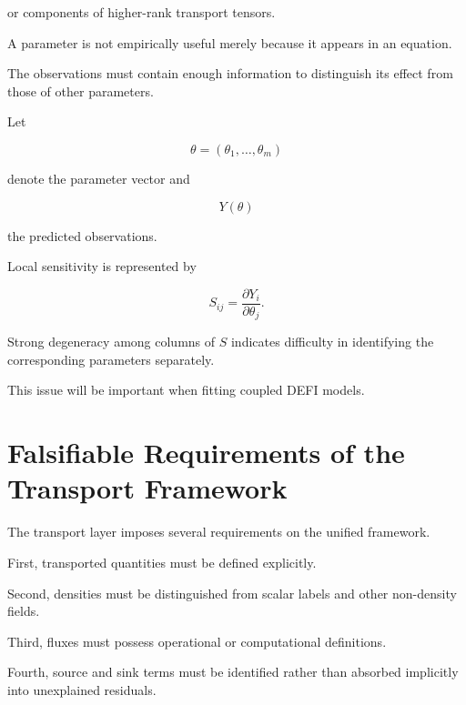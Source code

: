 \documentclass[12pt,oneside]{book}
\begin{document}
or components of higher-rank transport tensors.

A parameter is not empirically useful merely because it appears
in an equation.

The observations must contain enough information to distinguish
its effect from those of other parameters.

Let

\begin{equation}
    \theta
    =
    \left(
        \theta_1,
        \ldots,
        \theta_m
    \right)
\end{equation}

denote the parameter vector and

\begin{equation}
    Y(\theta)
\end{equation}

the predicted observations.

Local sensitivity is represented by

\begin{equation}
    S_{ij}
    =
    \frac{\partial Y_i}
         {\partial\theta_j}.
    \label{eq:transport-sensitivity-matrix}
\end{equation}

Strong degeneracy among columns of \(S\) indicates difficulty in
identifying the corresponding parameters separately.

This issue will be important when fitting coupled DEFI models.


\section{Falsifiable Requirements of the Transport Framework}
\label{sec:transport-falsifiability}

The transport layer imposes several requirements on the unified
framework.

First, transported quantities must be defined explicitly.

Second, densities must be distinguished from scalar labels and
other non-density fields.

Third, fluxes must possess operational or computational
definitions.

Fourth, source and sink terms must be identified rather than
absorbed implicitly into unexplained residuals.
\end{document}
